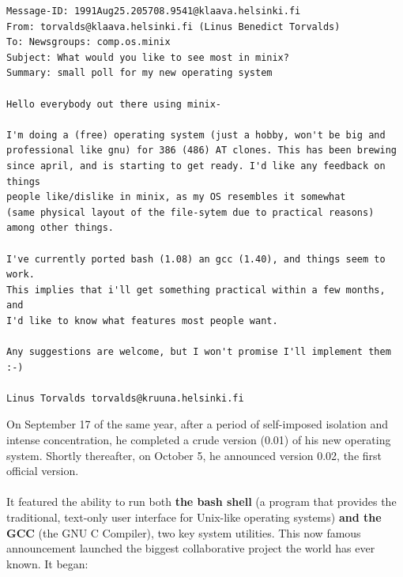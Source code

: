 \documentclass[11pt]{article}
\begin{document}
\begin{verbatim}
Message-ID: 1991Aug25.205708.9541@klaava.helsinki.fi 
From: torvalds@klaava.helsinki.fi (Linus Benedict Torvalds) 
To: Newsgroups: comp.os.minix 
Subject: What would you like to see most in minix? 
Summary: small poll for my new operating system

Hello everybody out there using minix-

I'm doing a (free) operating system (just a hobby, won't be big and
professional like gnu) for 386 (486) AT clones. This has been brewing 
since april, and is starting to get ready. I'd like any feedback on things 
people like/dislike in minix, as my OS resembles it somewhat
(same physical layout of the file-sytem due to practical reasons)
among other things.

I've currently ported bash (1.08) an gcc (1.40), and things seem to work. 
This implies that i'll get something practical within a few months, and 
I'd like to know what features most people want.

Any suggestions are welcome, but I won't promise I'll implement them :-)

Linus Torvalds torvalds@kruuna.helsinki.fi
\end{verbatim}
On September 17 of the same year, after a period of self-imposed isolation and intense concentration, he completed a crude version (0.01) of his new operating system. Shortly thereafter, on October 5, he announced version 0.02, the first official version.\\
\\
It featured the ability to run both \textbf{the bash shell} (a program that provides the traditional, text-only user interface for Unix-like operating systems) \textbf{and the GCC} (the GNU C Compiler), two key system utilities. This now famous announcement launched the biggest collaborative project the world has ever known. It began:
\end{document}
